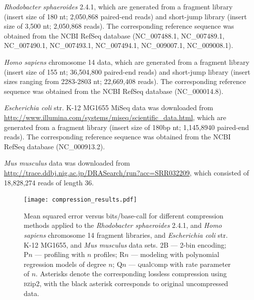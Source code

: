 \textit{Rhodobacter sphaeroides} 2.4.1, which are generated from a
fragment library (insert size of 180 nt; 2,050,868 paired-end reads)
and short-jump library (insert size of 3,500 nt; 2,050,868 reads). The
corresponding reference sequence was obtained from the NCBI RefSeq
database (NC\_007488.1, NC\_007489.1, NC\_007490.1, NC\_007493.1,
NC\_007494.1, NC\_009007.1, NC\_009008.1).


\textit{Homo sapiens} chromosome 14 data, which are generated from a
fragment library (insert size of 155 nt; 36,504,800 paired-end reads)
and short-jump library (insert sizes ranging from 2283-2803 nt;
22,669,408 reads). The corresponding reference sequence was obtained
from the NCBI RefSeq database (NC\_000014.8).

\textit{Escherichia coli} str. K-12 MG1655 MiSeq data was downloaded
from \url{http://www.illumina.com/systems/miseq/scientific_data.html},
which are generated from a fragment library (insert size of 180bp nt;
1,145,8940 paired-end reads). The corresponding reference sequence
was obtained from the NCBI RefSeq database (NC\_000913.2).

\textit{Mus musculus} data was downloaded from
\url{http://trace.ddbj.nig.ac.jp/DRASearch/run?acc=SRR032209}, which
consisted of 18,828,274 reads of length 36.

\begin{figure}[!tpb]%
\begin{center}
\texttt{[image: compression\_results.pdf]}
\end{center}
\renewcommand{\baselinestretch}{1}
\small\normalsize
\begin{quote}
\caption[Mean squared error versus bits/base-call for different
  compression methods applied to the \textit{Rhodobacter sphaeroides}
  2.4.1, and \textit{Homo sapiens} chromosome 14 fragment libraries,
  and \textit{Escherichia coli} str. K-12 MG1655, and \textit{Mus
    musculus} data sets]{Mean squared error versus bits/base-call for different
  compression methods applied to the \textit{Rhodobacter sphaeroides}
  2.4.1, and \textit{Homo sapiens} chromosome 14 fragment libraries,
  and \textit{Escherichia coli} str. K-12 MG1655, and \textit{Mus
    musculus} data sets. 2B --- 2-bin encoding; P$n$ --- profiling
  with $n$ profiles; R$n$ --- modeling with polynomial regression
  models of degree $n$; Q$n$ --- \textsc{q}ual\textsc{c}omp with rate parameter of
  $n$. Asterisks denote the corresponding lossless compression using
  \textsc{bz}ip2, with the black asterisk corresponds to original uncompressed
  data.}
  \label{fig:mse_vs_bpbp}
\end{quote}
\end{figure}
\renewcommand{\baselinestretch}{2}
\small\normalsize

